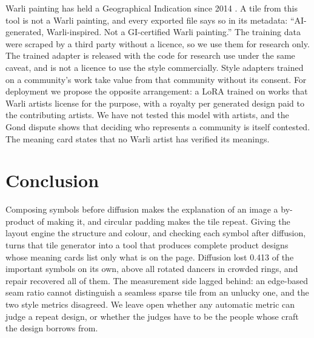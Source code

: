 \documentclass[conference]{IEEEtran}
\begin{document}
Warli painting has held a Geographical Indication since 2014 \cite{gi_warli}. A tile from this tool is not a Warli painting, and every exported file says so in its metadata: ``AI-generated, Warli-inspired. Not a GI-certified Warli painting.'' The training data were scraped by a third party without a licence, so we use them for research only. The trained adapter is released with the code for research use under the same caveat, and is not a licence to use the style commercially. Style adapters trained on a community's work take value from that community without its consent. For deployment we propose the opposite arrangement: a LoRA trained on works that Warli artists license for the purpose, with a royalty per generated design paid to the contributing artists. We have not tested this model with artists, and the Gond dispute \cite{pari_gond} shows that deciding who represents a community is itself contested. The meaning card states that no Warli artist has verified its meanings.

\section{Conclusion}

Composing symbols before diffusion makes the explanation of an image a by-product of making it, and circular padding makes the tile repeat. Giving the layout engine the structure and colour, and checking each symbol after diffusion, turns that tile generator into a tool that produces complete product designs whose meaning cards list only what is on the page. Diffusion lost 0.413 of the important symbols on its own, above all rotated dancers in crowded rings, and repair recovered all of them. The measurement side lagged behind: an edge-based seam ratio cannot distinguish a seamless sparse tile from an unlucky one, and the two style metrics disagreed. We leave open whether any automatic metric can judge a repeat design, or whether the judges have to be the people whose craft the design borrows from.



\end{document}
